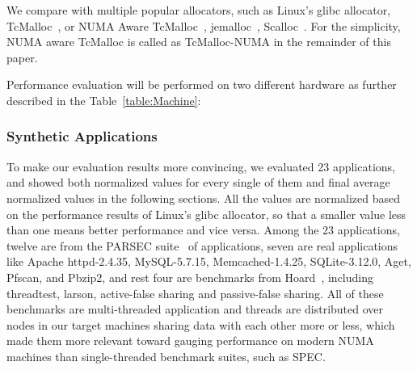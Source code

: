\label{sec:performance}


We compare \NM{} with multiple popular allocators, such as Linux's glibc allocator, TcMalloc~\cite{tcmalloc}, or NUMA Aware TcMalloc~\cite{tcmallocnew}, jemalloc~\cite{jemalloc}, Scalloc~\cite{Scalloc}. For the simplicity, NUMA aware TcMalloc is called as TcMalloc-NUMA in the remainder of this paper. 

Performance evaluation will be performed on two different hardware as further described in the Table~\ref{table:Machine}:









\subsubsection{Synthetic Applications}
\label{sec:synthetic}

To make our evaluation results more convincing, we evaluated 23 applications, and showed both normalized values for every single of them and final average normalized values in the following sections. All the values are normalized based on the performance results of Linux's glibc allocator, so that a smaller value less than one means better performance and vice versa. Among the 23 applications, twelve are from the PARSEC suite~\cite{parsec} of applications, seven are real applications like Apache httpd-2.4.35, MySQL-5.7.15, Memcached-1.4.25, SQLite-3.12.0, Aget, Pfscan, and Pbzip2, and rest four are benchmarks from Hoard~\cite{Hoard}, including threadtest, larson, active-false sharing and passive-false sharing. All of these benchmarks are multi-threaded application and threads are distributed over nodes in our target machines sharing data with each other more or less, which made them more relevant toward gauging performance on modern NUMA machines than single-threaded benchmark suites, such as SPEC.

